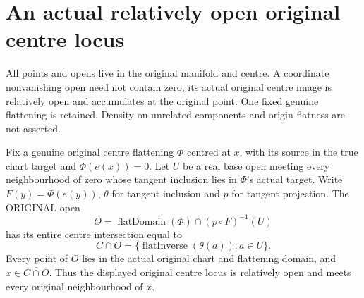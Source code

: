 \section{An actual relatively open original centre locus}

All points and opens live in the original manifold and centre. A coordinate
nonvanishing open need not contain zero; its actual original centre image is
relatively open and accumulates at the original point. One fixed genuine
flattening is retained. Density on unrelated components and origin flatness
are not asserted.

\begin{lemma}
\label{hir:real-domain-fixed-flattening-original-relative-centre-open}
\leanok
Fix a genuine original centre flattening $\Phi$ centred at $x$, with its
source in the true chart target and $\Phi(e(x))=0$. Let $U$ be a real base
open meeting every neighbourhood of zero whose tangent inclusion lies in
$\Phi$'s actual target. Write $F(y)=\Phi(e(y))$, $\theta$ for tangent inclusion
and $p$ for tangent projection. The ORIGINAL open
\[
 O=\operatorname{flatDomain}(\Phi)\cap (p\circ F)^{-1}(U)
\]
has its entire centre intersection equal to
\[
 C\cap O=\{\operatorname{flatInverse}(\theta(a)):a\in U\}.
\]
Every point of $O$ lies in the actual original chart and flattening domain,
and $x\in\overline{C\cap O}$. Thus the displayed original centre locus is
relatively open and meets every original neighbourhood of $x$.
\end{lemma}
